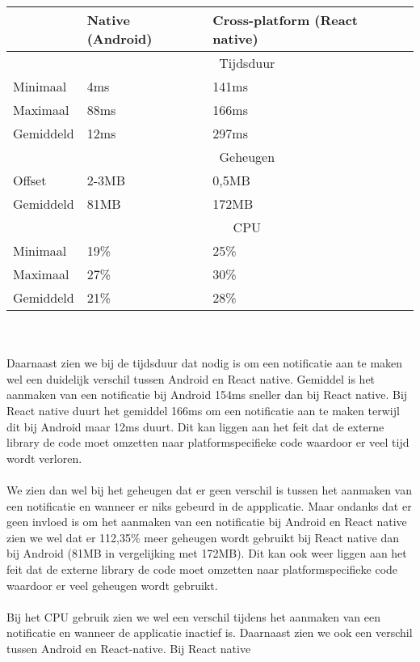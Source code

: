 \begin{tabular}{ |p{3cm}||p{5cm}|p{5cm}| }
    \hline
     & Native (Android) & Cross-platform (React native) \\
    \hline
     & \multicolumn{2}{|c|}{Tijdsduur} \\
    \hline
    Minimaal & 4ms & 141ms \\
    Maximaal & 88ms & 166ms \\
    Gemiddeld & 12ms & 297ms \\
    \hline
     & \multicolumn{2}{|c|}{Geheugen} \\ 
    \hline
    Offset & 2-3MB & 0,5MB \\
    Gemiddeld & 81MB & 172MB \\
    \hline
     & \multicolumn{2}{|c|}{CPU} \\
    \hline
    Minimaal & 19\% & 25\% \\
    Maximaal & 27\% & 30\% \\
    Gemiddeld & 21\% & 28\% \\
    \hline
\end{tabular}
\\\\
Daarnaast zien we bij de tijdsduur dat nodig is om een notificatie aan te maken wel een duidelijk 
verschil tussen Android en React native. Gemiddel is het aanmaken van een notificatie bij Android
154ms sneller dan bij React native. Bij React native duurt het gemiddel 166ms om een notificatie 
aan te maken terwijl dit bij Android maar 12ms duurt. Dit kan liggen aan het feit dat de externe 
library de code moet omzetten naar platformspecifieke code waardoor er veel tijd wordt verloren.
\\\\
We zien dan wel bij het geheugen dat er geen verschil is tussen het aanmaken van een notificatie en wanneer er 
niks gebeurd in de appplicatie. Maar ondanks dat er geen invloed is om het aanmaken van een notificatie bij 
Android en React native zien we wel dat er 112,35\% meer geheugen wordt gebruikt bij React native dan 
bij Android (81MB in vergelijking met 172MB). Dit kan ook weer liggen aan het feit dat de externe library
de code moet omzetten naar platformspecifieke code waardoor er veel geheugen wordt gebruikt.
\\\\
Bij het CPU gebruik zien we wel een verschil tijdens het aanmaken van een notificatie en wanneer de 
applicatie inactief is. Daarnaast zien we ook een verschil tussen Android en React-native. Bij React native 
